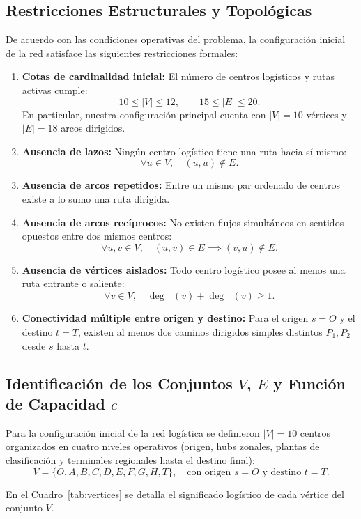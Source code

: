 \documentclass[11pt,a4paper]{article}
\begin{document}
\subsection{Restricciones Estructurales y Topológicas}
De acuerdo con las condiciones operativas del problema, la configuración inicial de la red satisface las siguientes restricciones formales:
\begin{enumerate}
    \item \textbf{Cotas de cardinalidad inicial:} El número de centros logísticos y rutas activas cumple:
    \[
        10 \le |V| \le 12, \qquad 15 \le |E| \le 20.
    \]
    En particular, nuestra configuración principal cuenta con $|V| = 10$ vértices y $|E| = 18$ arcos dirigidos.
    \item \textbf{Ausencia de lazos:} Ningún centro logístico tiene una ruta hacia sí mismo:
    \[
        \forall u \in V, \quad (u, u) \notin E.
    \]
    \item \textbf{Ausencia de arcos repetidos:} Entre un mismo par ordenado de centros existe a lo sumo una ruta dirigida.
    \item \textbf{Ausencia de arcos recíprocos:} No existen flujos simultáneos en sentidos opuestos entre dos mismos centros:
    \[
        \forall u, v \in V, \quad (u, v) \in E \implies (v, u) \notin E.
    \]
    \item \textbf{Ausencia de vértices aislados:} Todo centro logístico posee al menos una ruta entrante o saliente:
    \[
        \forall v \in V, \quad \deg^+(v) + \deg^-(v) \ge 1.
    \]
    \item \textbf{Conectividad múltiple entre origen y destino:} Para el origen $s = O$ y el destino $t = T$, existen al menos dos caminos dirigidos simples distintos $P_1, P_2$ desde $s$ hasta $t$.
\end{enumerate}

\subsection{Identificación de los Conjuntos $V$, $E$ y Función de Capacidad $c$}
Para la configuración inicial de la red logística se definieron $|V| = 10$ centros organizados en cuatro niveles operativos (origen, hubs zonales, plantas de clasificación y terminales regionales hasta el destino final):
\[
    V = \{O, A, B, C, D, E, F, G, H, T\}, \quad \text{con origen } s = O \text{ y destino } t = T.
\]

En el Cuadro~\ref{tab:vertices} se detalla el significado logístico de cada vértice del conjunto $V$.
\end{document}
